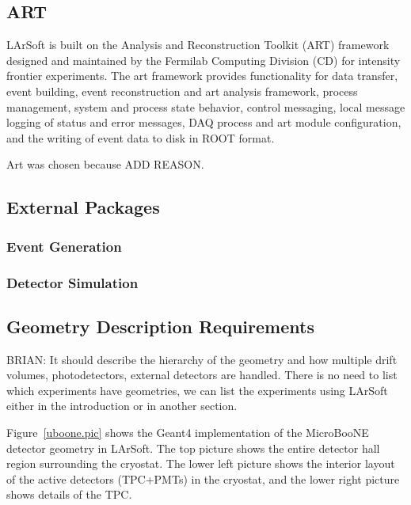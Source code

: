 \documentclass[12pt]{elsarticle}
\begin{document}
\subsection{ART}
LArSoft is built on the Analysis and Reconstruction Toolkit (ART) framework designed and maintained by the Fermilab Computing Division (CD) for intensity frontier experiments. 
The art framework provides functionality for data transfer, event building, event reconstruction and art analysis framework, process management, system and process state behavior, control messaging, local message logging of status and error messages, DAQ process and art module configuration, and the writing of event data to disk in ROOT format. \cite{art-ref}

Art was chosen because ADD REASON.
\subsection{External Packages}
\subsubsection{Event Generation}
\subsubsection{Detector Simulation}

\subsection{Geometry Description Requirements}
BRIAN:  It should describe the hierarchy of the geometry and how multiple drift volumes, photodetectors, external detectors are handled.  There is no need to list which experiments have geometries, we can list the experiments using LArSoft either in the introduction or in another section.

Figure~\ref{uboone.pic} shows the Geant4 implementation of the MicroBooNE detector geometry in LArSoft.  The top picture shows the entire detector hall region surrounding the cryostat.  The lower left picture shows the interior layout of the active detectors (TPC+PMTs) in the cryostat, and the lower right picture shows details of the TPC.
\end{document}
